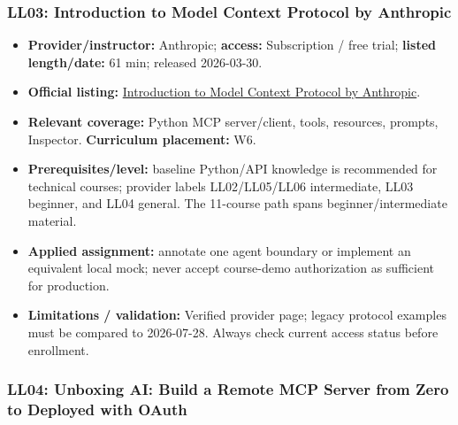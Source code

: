 \documentclass[
  10pt,
]{article}
\providecommand{\tightlist}{%
  \setlength{\itemsep}{0pt}\setlength{\parskip}{0pt}}
\begin{document}
\subsubsection{LL03: Introduction to Model Context Protocol by
Anthropic}\label{ll03-introduction-to-model-context-protocol-by-anthropic}

\begin{itemize}
\tightlist
\item
  \textbf{Provider/instructor:} Anthropic; \textbf{access:} Subscription
  / free trial; \textbf{listed length/date:} 61 min; released
  2026-03-30.
\item
  \textbf{Official listing:}
  \href{https://www.linkedin.com/learning/introduction-to-model-context-protocol-by-anthropic}{Introduction
  to Model Context Protocol by Anthropic}.
\item
  \textbf{Relevant coverage:} Python MCP server/client, tools,
  resources, prompts, Inspector. \textbf{Curriculum placement:} W6.
\item
  \textbf{Prerequisites/level:} baseline Python/API knowledge is
  recommended for technical courses; provider labels LL02/LL05/LL06
  intermediate, LL03 beginner, and LL04 general. The 11-course path
  spans beginner/intermediate material.
\item
  \textbf{Applied assignment:} annotate one agent boundary or implement
  an equivalent local mock; never accept course-demo authorization as
  sufficient for production.
\item
  \textbf{Limitations / validation:} Verified provider page; legacy
  protocol examples must be compared to 2026-07-28. Always check current
  access status before enrollment.
\end{itemize}

\subsubsection{LL04: Unboxing AI: Build a Remote MCP Server from Zero to
Deployed with
OAuth}\label{ll04-unboxing-ai-build-a-remote-mcp-server-from-zero-to-deployed-with-oauth}
\end{document}
